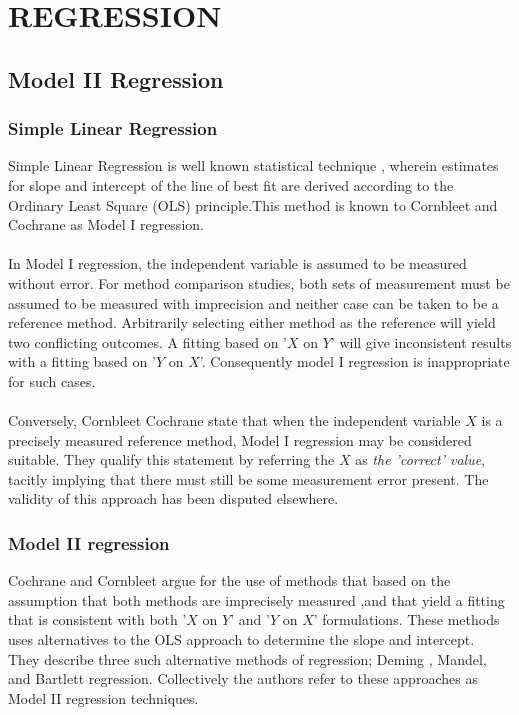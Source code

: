 

\chapter{REGRESSION}%
\section{Model II Regression}
\subsection{Simple Linear Regression} Simple Linear Regression is  well
known statistical technique , wherein estimates for slope and
intercept of the line of best fit are derived according to the
Ordinary Least Square (OLS) principle.This method is known to
Cornbleet and Cochrane as Model I regression.
\\
\\
In Model I regression, the independent variable is assumed to be
measured without error. For method comparison studies, both sets
of measurement must be assumed to be measured with imprecision and
neither case can be taken to be a reference method. Arbitrarily
selecting either method as the reference will yield two
conflicting outcomes. A fitting based on '$X$ on $Y$' will give
inconsistent results with a fitting based on '$Y$ on $X$'.
Consequently model I regression is inappropriate for such cases.
\\
\\
Conversely, Cornbleet Cochrane state that when the independent
variable $X$ is a precisely measured reference method, Model I
regression may be considered suitable. They qualify this statement
by referring the $X$ as \emph{the 'correct' value}, tacitly
implying that there must still be some measurement error present.
The validity of this approach has been disputed elsewhere.




\subsection{Model II regression}
Cochrane and Cornbleet argue for the use of methods that based on
the assumption that both methods are imprecisely measured ,and
that yield a fitting that is consistent with both '$X$ on $Y$' and
'$Y$ on $X$' formulations. These methods uses alternatives to the
OLS approach to determine the slope and intercept.
\\
They describe three such alternative methods of regression; Deming
, Mandel, and Bartlett regression. Collectively the authors refer
to these approaches as Model II regression techniques.

